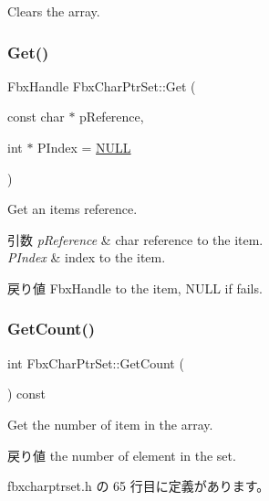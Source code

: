 Clears the array. 

\mbox{\label{class_fbx_char_ptr_set_a626ae8a1c9406567c09755f467902b84}} 
\subsubsection{\texorpdfstring{Get()}{Get()}}
{\footnotesize\ttfamily Fbx\+Handle Fbx\+Char\+Ptr\+Set\+::\+Get (\begin{DoxyParamCaption}\item[{const char $\ast$}]{p\+Reference,  }\item[{int $\ast$}]{P\+Index = {\ttfamily \hyperlink{fbxarch_8h_a070d2ce7b6bb7e5c05602aa8c308d0c4}{N\+U\+LL}} }\end{DoxyParamCaption})}

Get an item\textquotesingle{}s reference. 
\begin{DoxyParams}{引数}
{\em p\+Reference} & char reference to the item. \\
\hline
{\em P\+Index} & index to the item. \\
\hline
\end{DoxyParams}
\begin{DoxyReturn}{戻り値}
Fbx\+Handle to the item, N\+U\+LL if fails. 
\end{DoxyReturn}
\mbox{\label{class_fbx_char_ptr_set_ab62ea2f88eed06e033e4ae7c516e96a0}} 
\subsubsection{\texorpdfstring{Get\+Count()}{GetCount()}}
{\footnotesize\ttfamily int Fbx\+Char\+Ptr\+Set\+::\+Get\+Count (\begin{DoxyParamCaption}{ }\end{DoxyParamCaption}) const\hspace{0.3cm}{\ttfamily [inline]}}

Get the number of item in the array. \begin{DoxyReturn}{戻り値}
the number of element in the set. 
\end{DoxyReturn}


 fbxcharptrset.\+h の 65 行目に定義があります。

